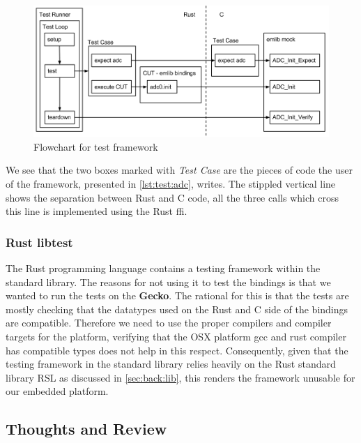 \begin{figure}[H]
  \begin{center}
    \includegraphics[scale=0.3]{figures/testframework}
  \end{center}
  \caption{Flowchart for test framework}
  \label{fig:test-framework}
\end{figure}

We see that the two boxes marked with \textit{Test Case} are the pieces of code the user of the framework, presented in \autoref{lst:test:adc}, writes.
The stippled vertical line shows the separation between Rust and C code, all the three calls which cross this line is implemented using the Rust \gls{ffi}.

\subsubsection{Rust libtest}

The Rust programming language contains a testing framework within the standard library.
The reasons for not using it to test the bindings is that we wanted to run the tests on the \textbf{Gecko}.
The rational for this is that the tests are mostly checking that the datatypes used on the Rust and C side of the bindings are compatible.
Therefore we need to use the proper compilers and compiler targets for the platform, verifying that the OSX platform gcc and rust compiler has compatible types does not help in this respect.
Consequently, given that the testing framework in the standard library relies heavily on the Rust standard library RSL as discussed in \autoref{sec:back:lib}, this renders the framework unusable for our embedded platform.

\subsection{Thoughts and Review}


